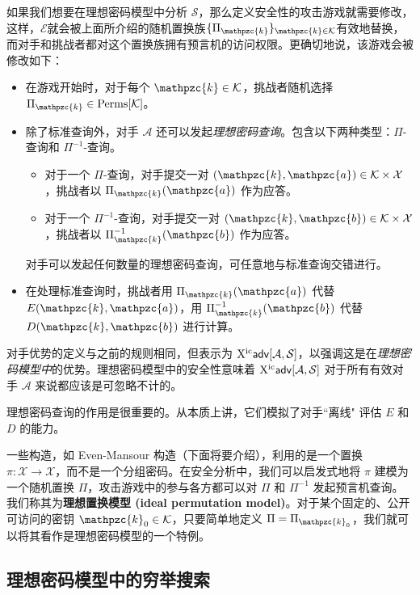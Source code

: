 如果我们想要在理想密码模型中分析 $\mathcal{S}$，那么定义安全性的攻击游戏就需要修改，这样，$\mathcal{E}$就会被上面所介绍的随机置换族$\{\Pi_\mathpzc{k}\}_{\mathpzc{k}\in\mathcal{K}}$有效地替换，而对手和挑战者都对这个置换族拥有预言机的访问权限。更确切地说，该游戏会被修改如下：
\begin{itemize}
	\item 在游戏开始时，对于每个 $\mathpzc{k}\in\mathcal{K}$，挑战者随机选择 $\Pi_\mathpzc{k}\in\rm{Perms}[\mathcal{K}]$。
	\item 除了标准查询外，对手 $\mathcal{A}$ 还可以发起\emph{理想密码查询}。包含以下两种类型：$\Pi$-查询和 $\Pi^{-1}$-查询。
	\begin{itemize}
		\item 对于一个 $\Pi$-查询，对手提交一对 $(\mathpzc{k},\mathpzc{a})\in\mathcal{K}\times\mathcal{X}$，挑战者以 $\Pi_\mathpzc{k}(\mathpzc{a})$ 作为应答。
		\item 对于一个 $\Pi^{-1}$-查询，对手提交一对 $(\mathpzc{k},\mathpzc{b})\in\mathcal{K}\times\mathcal{X}$，挑战者以 $\Pi_\mathpzc{k}^{-1}(\mathpzc{b})$ 作为应答。
	\end{itemize}
	对手可以发起任何数量的理想密码查询，可任意地与标准查询交错进行。
	\item 在处理标准查询时，挑战者用 $\Pi_\mathpzc{k}(\mathpzc{a})$ 代替 $E(\mathpzc{k},\mathpzc{a})$，用 $\Pi_\mathpzc{k}^{-1}(\mathpzc{b})$ 代替 $D(\mathpzc{k},\mathpzc{b})$ 进行计算。
\end{itemize}
对手优势的定义与之前的规则相同，但表示为 ${\rm X^{ic}}\mathsf{adv}[\mathcal{A},\mathcal{S}]$，以强调这是在\emph{理想密码模型中}的优势。理想密码模型中的安全性意味着 ${\rm X^{ic}}\mathsf{adv}[\mathcal{A},\mathcal{S}]$ 对于所有有效对手 $\mathcal{A}$ 来说都应该是可忽略不计的。

理想密码查询的作用是很重要的。从本质上讲，它们模拟了对手``离线" 评估 $E$ 和 $D$ 的能力。

\begin{snote}[理想置换模型。]
一些构造，如 Even-Mansour 构造（下面将要介绍），利用的是一个置换 $\pi:\mathcal{X}\to\mathcal{X}$，而不是一个分组密码。在安全分析中，我们可以启发式地将 $\pi$ 建模为一个随机置换 $\Pi$，攻击游戏中的参与各方都可以对 $\Pi$ 和 $\Pi^{-1}$ 发起预言机查询。我们称其为\textbf{理想置换模型 (ideal permutation model)}。对于某个固定的、公开可访问的密钥 $\mathpzc{k}_0\in\mathcal{K}$，只要简单地定义 $\Pi=\Pi_{\mathpzc{k}_0}$，我们就可以将其看作是理想密码模型的一个特例。
\end{snote}

\subsection{理想密码模型中的穷举搜索}\label{subsec:4-7-2}

